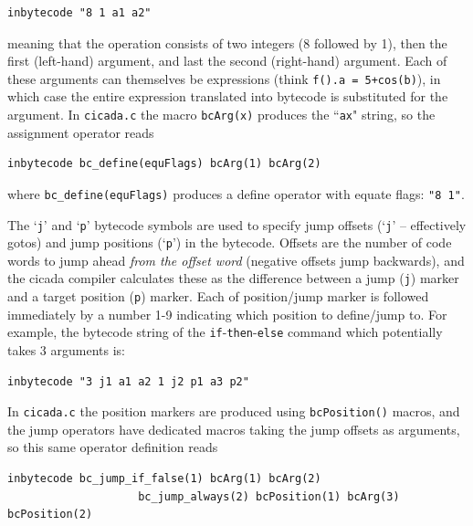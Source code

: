 \documentclass{article}
\newenvironment{code}{
       \begin{list}{}{
               \setlength{\leftmargin}{.4in}
               \setlength{\rightmargin}{0in}
               \setlength{\topsep}{.2in}
       }
       \small
       \item[] }
       { \end{list}   }
\begin{document}
\begin{code} \begin{verbatim}
inbytecode "8 1 a1 a2"
\end{verbatim} \end{code}

\noindent meaning that the operation consists of two integers (8 followed by 1), then the first (left-hand) argument, and last the second (right-hand) argument.  Each of these arguments can themselves be expressions (think \verb#f().a = 5+cos(b)#), in which case the entire expression translated into bytecode is substituted for the argument.  In \verb#cicada.c# the macro \verb#bcArg(x)# produces the ``\verb#ax#" string, so the assignment operator reads

\begin{code} \begin{verbatim}
inbytecode bc_define(equFlags) bcArg(1) bcArg(2)
\end{verbatim} \end{code}

\noindent where \verb#bc_define(equFlags)# produces a define operator with equate flags:  \verb#"8 1"#.

The `\verb#j#' and `\verb#p#' bytecode symbols are used to specify jump offsets (`\verb#j#' -- effectively gotos) and jump positions (`\verb#p#') in the bytecode.  Offsets are the number of code words to jump ahead \emph{from the offset word} (negative offsets jump backwards), and the cicada compiler calculates these as the difference between a jump (\verb#j#) marker and a target position (\verb#p#) marker.  Each of position/jump marker is followed immediately by a number 1-9 indicating which position to define/jump to.  For example, the bytecode string of the \verb#if#-\verb#then#-\verb#else# command which potentially takes 3 arguments is:

\begin{code} \begin{verbatim}
inbytecode "3 j1 a1 a2 1 j2 p1 a3 p2"
\end{verbatim} \end{code}

\noindent In \verb#cicada.c# the position markers are produced using \verb#bcPosition()# macros, and the jump operators have dedicated macros taking the jump offsets as arguments, so this same operator definition reads

\begin{code} \begin{verbatim}
inbytecode bc_jump_if_false(1) bcArg(1) bcArg(2)
                    bc_jump_always(2) bcPosition(1) bcArg(3) bcPosition(2)
\end{verbatim} \end{code}
\end{document}
